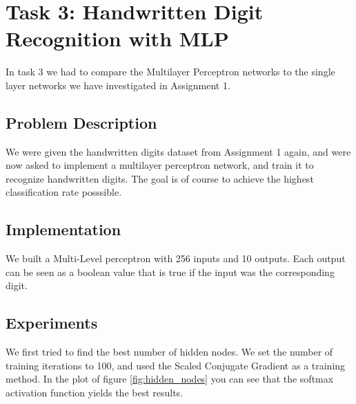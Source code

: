 \documentclass{article}
\begin{document}
\newpage
\section{Task 3: Handwritten Digit Recognition with MLP}
In task 3 we had to compare the Multilayer Perceptron networks to the single layer networks we have investigated in Assignment 1.

\subsection{Problem Description}
We were given the handwritten digits dataset from Assignment 1 again, and were now asked to implement a multilayer perceptron network, and train it to recognize handwritten digits.
The goal is of course to achieve the highest classification rate posssible.

\subsection{Implementation}
We built a Multi-Level perceptron with 256 inputs and 10 outputs. Each output can be seen as a boolean value that is true if the input was the corresponding digit.

\newpage
\subsection{Experiments}
We first tried to find the best number of hidden nodes. We set the number of training iterations to 100, and used the Scaled Conjugate Gradient as a training method. In the plot of figure \ref{fig:hidden_nodes} you can see that the softmax activation function yields the best results.
\end{document}
